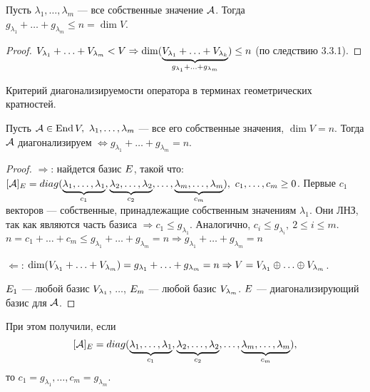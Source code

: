 \documentclass[main]{subfiles}
\begin{document}
\begin{corollary}
    Пусть $\lambda_1, \ldots, \lambda_m$ — все собственные значение $\mathcal{A}$.
    Тогда $g_{\lambda_1} + \ldots + g_{\lambda_m} \le n = \dim V$.
\end{corollary}

\begin{proof}
    $V_{\lambda_1} + \ldots + V_{\lambda_m} < V
        \Rightarrow \dim (\underbrace{V_{\lambda_1} + \ldots + V_{\lambda_k}}_{g_{\lambda_1} + \ldots + g_{\lambda_m}}) \leq n$ (по следствию 3.3.1).
\end{proof}

\begin{proposition}
    Критерий диагонализируемости оператора в терминах геометрических кратностей.

    Пусть $\mathcal{A} \in \operatorname{End} V,\ \lambda_1, \ldots, \lambda_m$  — все его собственные значения,
    $\dim V = n$. Тогда $\mathcal{A}$  диагонализируем $\Leftrightarrow
        g_{\lambda_1} + \ldots +  g_{\lambda_m} = n$.
\end{proposition}

\begin{proof}
    $\Rightarrow$: найдется базис $E$, такой что:
    $[\mathcal{A}]_E = diag(\underbrace{\lambda_1, \ldots, \lambda_1}_{c_1},
        \underbrace{\lambda_2, \ldots, \lambda_2}_{c_2}, \ldots,
        \underbrace{\lambda_m, \ldots, \lambda_m}_{c_m}), \  c_1, \ldots, c_m \geq 0$.
    Первые $c_1$  векторов  — собственные, принадлежащие собственным значениям
    $\lambda_1$. Они ЛНЗ, так как являются часть базиса $\Rightarrow c_1 \leq g_{\lambda_1}$.
    Аналогично, $c_i \leq g_{\lambda_i},\ 2 \leq i \leq m$.
    $n = c_1 + \ldots + c_m \leq g_{\lambda_1} + \ldots + g_{\lambda_m} = n
        \Rightarrow g_{\lambda_1} + \ldots + g_{\lambda_m} = n$

    $\Leftarrow$: $\dim (V_{\lambda_1} + \ldots + V_{\lambda_m}) =
        g_{\lambda_1} + \ldots + g_{\lambda_m} = n \Rightarrow
        V = V_{\lambda_1} \oplus \ldots \oplus  V_{\lambda_m}$.

    $E_1$  — любой базис $V_{\lambda_1}$, $\ldots$,
    $E_m$  — любой базис $V_{\lambda_m}$.
    $E$  — диагонализирующий базис для $\mathcal{A}$.
\end{proof}

\begin{remark}
    При этом получили, если
    \[[\mathcal{A}]_E = diag(\underbrace{\lambda_1, \ldots, \lambda_1}_{c_1},
        \underbrace{\lambda_2, \ldots, \lambda_2}_{c_2}, \ldots,
        \underbrace{\lambda_m, \ldots, \lambda_m}_{c_m}),\]
    то $c_1 = g_{\lambda_1}, \ldots,c_m = g_{\lambda_m}$.
\end{remark}
\end{document}
